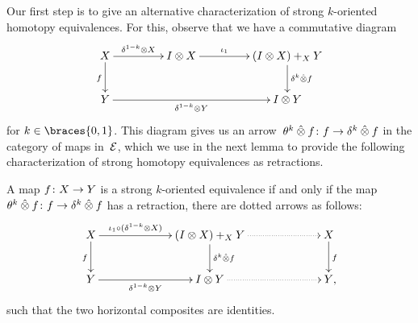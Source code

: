 \documentclass[reqno,10pt,a4paper,oneside,draft]{amsart}
\begin{document}
{{Our first step is to give an alternative characterization of strong $k$-oriented homotopy equivalences.
For this, observe that we have a commutative diagram 
\begin{equation}
\label{equ:thetak}
\begin{gathered}
\xymatrix@C+2em{
  X
  \ar[r]^-{\kcylinv \otimes X}
  \ar[d]_{f}
&
 \interval \otimes X 
 \ar[r]^-{\iota_1} 
 &
  (\interval \otimes X) +_X Y \ar[d]^{\kcyl \hatotimes f} 
  \\
  Y
  \ar[rr]_-{\kcylinv \otimes Y}
  & 
&
  \interval \otimes Y
}
\end{gathered}
\end{equation}
for $k \in \braces{0, 1}$. This diagram gives us an arrow~$\theta^k \mathbin{\hat{\otimes}} f \colon f \to \delta^k \mathbin{\hat{\otimes}} f$ in the category of maps 
in~$\mathcal{E}$, which we use in the next lemma to provide the following characterization of strong homotopy equivalences as retractions. 

\begin{lemma} \label{strong-h-equiv-as-section-non-alg}
A map $f \colon X \to Y$ is a strong $k$-oriented equivalence 
if and only if  the map $\theta^k \mathbin{\hat{\otimes}} f  \colon f \to \delta^k \mathbin{\hat{\otimes}} f$ has a retraction, \ie there are
dotted arrows as follows:
\[
\xymatrix@C+4em{
  X
  \ar[r]^-{\iota_1 \cc (\kcylinv \otimes X)}
  \ar[d]_f
&
  (\interval \otimes X) +_X Y
  \ar[d]^{\kcyl \hatotimes f}
  \ar@{.>}[r]
&
  X
  \ar[d]^f
\\
  Y
  \ar[r]_-{\kcylinv \otimes Y}
&
  \interval \otimes Y
  \ar@{.>}[r]
&
  Y
\rlap{,}}
\]
such that the two horizontal composites are identities.
\end{lemma}

}}
\end{document}
